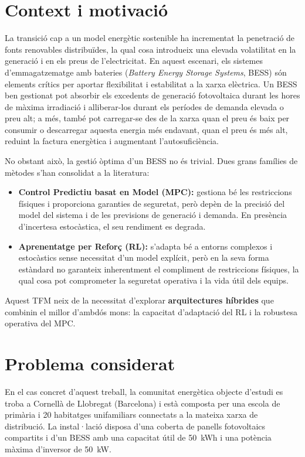\documentclass[a4paper,12pt,twoside]{ThesisStyle}
\begin{document}
\section{Context i motivació}

La transició cap a un model energètic sostenible ha incrementat la penetració de fonts renovables distribuïdes, la qual cosa introdueix una elevada volatilitat en la generació i en els preus de l'electricitat. En aquest escenari, els sistemes d'emmagatzematge amb bateries (\textit{Battery Energy Storage Systems}, BESS) són elements crítics per aportar flexibilitat i estabilitat a la xarxa elèctrica. Un BESS ben gestionat pot absorbir els excedents de generació fotovoltaica durant les hores de màxima irradiació i alliberar-los durant els períodes de demanda elevada o preu alt; a més, també pot carregar-se des de la xarxa quan el preu és baix per consumir o descarregar aquesta energia més endavant, quan el preu és més alt, reduint la factura energètica i augmentant l'autosuficiència.

No obstant això, la gestió òptima d'un BESS no és trivial. Dues grans famílies de mètodes s'han consolidat a la literatura:

\begin{itemize}
    \item \textbf{Control Predictiu basat en Model (MPC):} gestiona bé les restriccions físiques i proporciona garanties de seguretat, però depèn de la precisió del model del sistema i de les previsions de generació i demanda. En presència d'incertesa estocàstica, el seu rendiment es degrada.
    \item \textbf{Aprenentatge per Reforç (RL):} s'adapta bé a entorns complexos i estocàstics sense necessitat d'un model explícit, però en la seva forma estàndard no garanteix inherentment el compliment de restriccions físiques, la qual cosa pot comprometer la seguretat operativa i la vida útil dels equips.
\end{itemize}

Aquest TFM neix de la necessitat d'explorar \textbf{arquitectures híbrides} que combinin el millor d'ambdós mons: la capacitat d'adaptació del RL i la robustesa operativa del MPC.

\section{Problema considerat}

En el cas concret d'aquest treball, la comunitat energètica objecte d'estudi es troba a Cornellà de Llobregat (Barcelona) i està composta per una escola de primària i 20 habitatges unifamiliars connectats a la mateixa xarxa de distribució. La instal·lació disposa d'una coberta de panells fotovoltaics compartits i d'un BESS amb una capacitat útil de 50~kWh i una potència màxima d'inversor de 50~kW.
\end{document}
